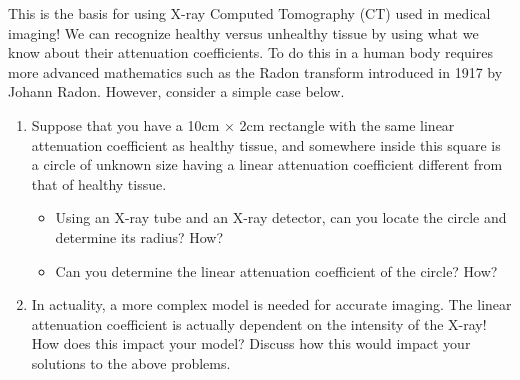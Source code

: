 \vfill

This is the basis for using X-ray Computed Tomography (CT) used in medical imaging! We can recognize healthy versus unhealthy tissue by using what we know about their attenuation coefficients. To do this in a human body requires more advanced mathematics such as the Radon transform introduced in 1917 by Johann Radon. However, consider a simple case below.

\vfill

\begin{enumerate}[resume,label=\emph{\arabic*.}]
\item Suppose that you have a 10cm $\times$ 2cm rectangle with the same linear attenuation coefficient as healthy tissue, and somewhere inside this square is a circle of unknown size having a linear attenuation coefficient different from that of healthy tissue.
\begin{itemize}
\item  Using an X-ray tube and an X-ray detector, can you locate the circle and determine its radius? How?
\item  Can you determine the linear attenuation coefficient of the circle? How?
 \end{itemize}

 \vfill
 
 \item In actuality, a more complex model is needed for accurate imaging. The linear attenuation coefficient is actually dependent on the intensity of the X-ray! How does this impact your model? Discuss how this would impact your solutions to the above problems.

\end{enumerate}

\begin{noexercises}
\end{noexercises}